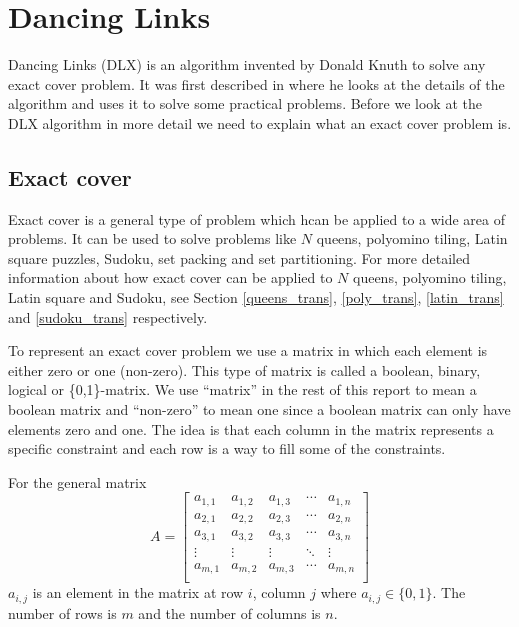 
\chapter{Dancing Links}
\label{dancing_links}

Dancing Links (DLX) is an algorithm invented by Donald Knuth to solve any exact cover problem.
It was first described in \cite{knuth00dancing} where he looks at the details of the algorithm and uses it to solve some practical problems.
Before we look at the DLX algorithm in more detail we need to explain what an exact cover problem is.



\section{Exact cover}
\label{exact_cover}

Exact cover is a general type of problem which hcan be applied to a wide area of problems.
It can be used to solve problems like $N$ queens, polyomino tiling, Latin square puzzles, Sudoku, set packing and set partitioning.
For more detailed information about how exact cover can be applied to $N$ queens, polyomino tiling, Latin square and Sudoku, see Section \ref{queens_trans}, \ref{poly_trans}, \ref{latin_trans} and \ref{sudoku_trans} respectively.

To represent an exact cover problem we use a matrix in which each element is either zero or one (non-zero).
This type of matrix is called a boolean, binary, logical or \{0,1\}-matrix.
We use ``matrix'' in the rest of this report to mean a boolean matrix and ``non-zero'' to mean one since a boolean matrix can only have elements zero and one.
The idea is that each column in the matrix represents a specific constraint and each row is a way to fill some of the constraints.

For the general matrix
\[
A =
\left[
\begin{array}{ccccc}
	a_{1,1} & a_{1,2} & a_{1,3} & \cdots & a_{1,n} \\
	a_{2,1} & a_{2,2} & a_{2,3} & \cdots & a_{2,n} \\
	a_{3,1} & a_{3,2} & a_{3,3} & \cdots & a_{3,n} \\
	\vdots  & \vdots  & \vdots  & \ddots & \vdots  \\
	a_{m,1} & a_{m,2} & a_{m,3} & \cdots & a_{m,n} \\
\end{array}
\right]
\]
$a_{i,j}$ is an element in the matrix at row $i$, column $j$ where $a_{i,j} \in \{0,1\}$.
The number of rows is $m$ and the number of columns is $n$.

